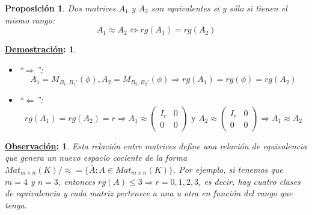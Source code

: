 \documentclass[10pt,a4paper,openright]{book}
\theoremstyle{break}
\newtheorem*{prop}{Proposición}
\newtheorem*{demo}{\underline{Demostración}:}
\newtheorem*{obs}{\underline{Observación}:}
\begin{document}
\begin{prop}
Dos matrices $A_1$ y $A_2$ son equivalentes si y sólo si tienen el mismo rango:
$$A_1\approx A_2\Leftrightarrow rg(A_1)=rg(A_2)$$
\end{prop}
\begin{demo}
\begin{itemize}
\item ``$\Rightarrow $'':
$$A_1=M_{B_1, B_1'}(\phi), A_2=M_{B_2, B_2'}(\phi)\Rightarrow rg(A_1)=rg(\phi)=rg(A_2)$$

\item ``$\Leftarrow$'':
$$rg(A_1)=rg(A_2)=r\Rightarrow A_1\approx \left(\begin{array}{c|c} I_r & 0  \\ \hline 0 & 0 \end{array}\right) \mbox{ y } A_2\approx\left(\begin{array}{c|c} I_r & 0  \\ \hline 0 & 0 \end{array}\right) \Rightarrow A_1\approx A_2$$
\end{itemize}
\end{demo}

\begin{obs}
Esta relación entre matrices define una relación de equivalencia que genera un nuevo espacio cociente de la forma $Mat_{m\times n}(K)/\approx=\{\bar{A}: A\in Mat_{m\times n}(K)\}$. Por ejemplo, si tenemos que $m=4$ y $n=3$, entonces $rg(A)\leq 3\Rightarrow r=0,1,2,3$, es decir, hay cuatro clases de equivalencia y cada matriz pertenece a una u otra en función del rango que tenga.
\end{obs}
\end{document}
